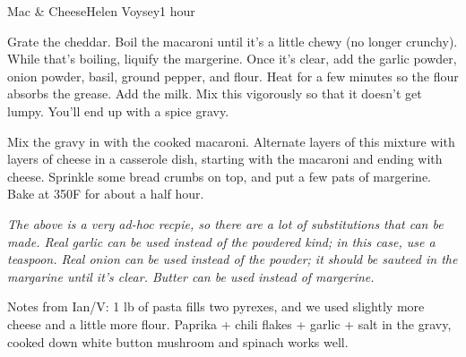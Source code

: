 \begin{recipe}{Mac \& Cheese}{Helen Voysey}{1 hour}

  Grate the cheddar. Boil the macaroni until it's a little chewy (no longer
  crunchy). While that's boiling, liquify the margerine. Once it's clear, add
  the garlic powder, onion powder, basil, ground pepper, and flour. Heat for a
  few minutes so the flour absorbs the grease. Add the milk. Mix this
  vigorously so that it doesn't get lumpy. You'll end up with a spice gravy.

  Mix the gravy in with the cooked macaroni. Alternate layers of this mixture
  with layers of cheese in a casserole dish, starting with the macaroni and
  ending with cheese. Sprinkle some bread crumbs on top, and put a few pats of
  margerine. Bake at 350\0F for about a half hour.
\end{recipe}
{\it The above is a very ad-hoc recpie, so there are a lot of substitutions
  that can be made. Real garlic can be used instead of the powdered kind; in
  this case, use a teaspoon. Real onion can be used instead of the powder; it
  should be sauteed in the margarine until it's clear. Butter can be used
  instead of margerine.

  Notes from Ian/V: 1 lb of pasta fills two pyrexes, and we used slightly more
  cheese and a little more flour. Paprika + chili flakes + garlic + salt in the
  gravy, cooked down white button mushroom and spinach works well.}
